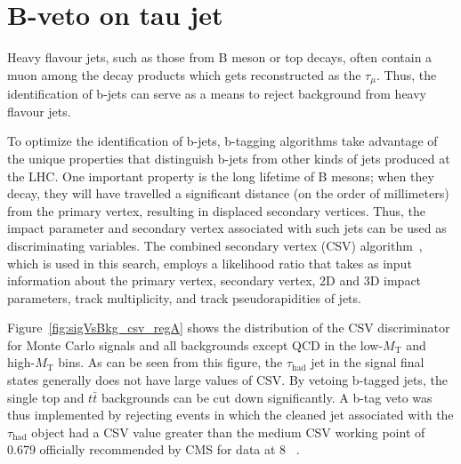 \section{B-veto on tau jet\label{sec:evtsel-bveto}}

Heavy flavour jets, such as those from B meson or top decays, often contain a muon among the decay products which gets reconstructed as the $\tau_{\mu}$. Thus, the identification of b-jets can serve as a means to reject background from heavy flavour jets.

To optimize the identification of b-jets, b-tagging algorithms take advantage of the unique properties that distinguish b-jets from other kinds of jets produced at the LHC. One important property is the long lifetime of B mesons; when they decay, they will have travelled a significant distance (on the order of millimeters) from the primary vertex, resulting in displaced secondary vertices.  Thus, the impact parameter and secondary vertex associated with such jets can be used as discriminating variables. The combined secondary vertex (CSV) algorithm~\cite{Weiser:927399}, which is used in this search, employs a likelihood ratio that takes as input information about the primary vertex, secondary vertex, 2D and 3D impact parameters, track multiplicity, and track pseudorapidities of jets.

Figure~\ref{fig:sigVsBkg_csv_regA} shows the distribution of the CSV discriminator for Monte Carlo signals and all backgrounds except QCD in the low-$M_{\text{T}}$ and high-$M_{\text{T}}$ bins. As can be seen from this figure, the $\tau_{\text{had}}$ jet in the signal final states generally does not have large values of CSV. By vetoing b-tagged jets, the single top and $t\bar{t}$ backgrounds can be cut down significantly. A b-tag veto was thus implemented by rejecting events in which the cleaned jet associated with the $\tau_{\text{had}}$ object had a CSV value greater than the medium CSV working point of 0.679 officially recommended by CMS for data at 8 \TeV~\cite{CMS:btvpogtwiki}.

